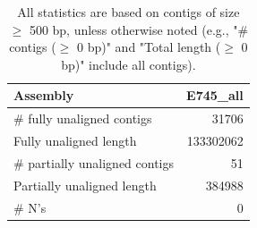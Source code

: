 \documentclass[12pt,a4paper]{article}
\begin{document}
\begin{table}[ht]
\begin{center}
\caption{All statistics are based on contigs of size $\geq$ 500 bp, unless otherwise noted (e.g., "\# contigs ($\geq$ 0 bp)" and "Total length ($\geq$ 0 bp)" include all contigs).}
\begin{tabular}{|l*{1}{|r}|}
\hline
Assembly & E745\_all \\ \hline
\# fully unaligned contigs & 31706 \\ \hline
Fully unaligned length & 133302062 \\ \hline
\# partially unaligned contigs & 51 \\ \hline
Partially unaligned length & 384988 \\ \hline
\# N's & 0 \\ \hline
\end{tabular}
\end{center}
\end{table}
\end{document}
